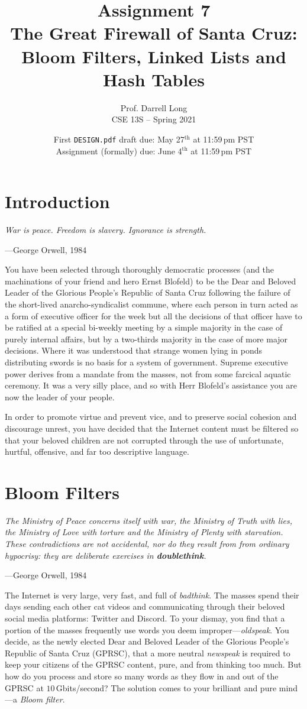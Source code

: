 \documentclass{article}
\title{Assignment 7\\The Great Firewall of Santa Cruz:\\Bloom Filters,
Linked Lists and Hash Tables}
\author{Prof. Darrell Long \\
CSE 13S -- Spring 2021}
\date{
  First \texttt{DESIGN.pdf} draft due: May 27$^\text{th}$ at 11:59\,pm PST \\
  Assignment (formally) due: June 4$^\text{th}$ at 11:59\,pm PST
}
\begin{document}
\maketitle

\section{Introduction}

\textwidth
\epigraph{\emph{War is peace. Freedom
is slavery. Ignorance is strength.}}{---George Orwell, 1984}

\noindent You have been selected through thoroughly democratic
processes (and the machinations of your friend and hero Ernst
Blofeld) to be the Dear and Beloved Leader of the Glorious People's
Republic of Santa Cruz following the failure of the short-lived
anarcho-syndicalist commune, where each person in turn acted as a
form of executive officer for the week but all the decisions of
that officer have to be ratified at a special bi-weekly meeting by
a simple majority in the case of purely internal affairs, but by a
two-thirds majority in the case of more major decisions. Where it
was understood that strange women lying in ponds distributing swords
is no basis for a system of government. Supreme executive power
derives from a mandate from the masses, not from some farcical
aquatic ceremony. It was a very silly place, and so with Herr
Blofeld's assistance you are now the leader of your people.

In order to promote virtue and prevent vice, and
to preserve social cohesion and discourage unrest, you have decided
that the Internet content must be filtered so that your beloved
children are not corrupted through the use of unfortunate, hurtful,
offensive, and far too descriptive language.


\section{Bloom Filters}

\textwidth
\epigraph{\emph{The Ministry of Peace concerns itself with war, the Ministry
of Truth with lies, the Ministry of Love with torture and the Ministry of
Plenty with starvation. These contradictions are not accidental, nor do they
result from from ordinary hypocrisy: they are deliberate exercises in
\textbf{doublethink}.}}{---George Orwell, 1984}

\noindent The Internet is very large, very fast, and full of
\emph{badthink}. The masses spend their days sending each other cat
videos and communicating through their beloved social media platforms:
Twitter and Discord. To your dismay, you find that a portion of the
masses frequently use words you deem improper---\emph{oldspeak}. You
decide, as the newly elected Dear and Beloved Leader of the Glorious
People's Republic of Santa Cruz (GPRSC), that a more neutral
\emph{newspeak} is required to keep your citizens of the GPRSC content,
pure, and from thinking too much. But how do you process and store so
many words as they flow in and out of the GPRSC at $10\,$Gbits/second?
The solution comes to your brilliant and pure mind---a \emph{Bloom
filter}.
\end{document}
